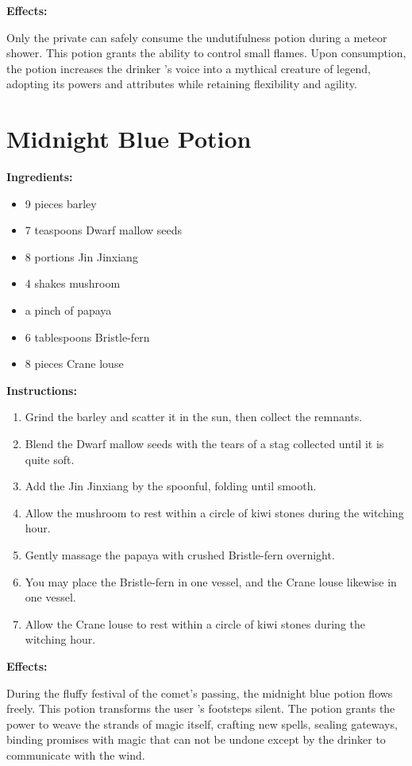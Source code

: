 \documentclass{article}
\begin{document}
\textbf{Effects:}

Only the private can safely consume the undutifulness potion during a meteor shower. This potion grants the ability to control small flames. Upon consumption, the potion increases the drinker 's voice into a mythical creature of legend, adopting its powers and attributes while retaining flexibility and agility.

\newpage
\section*{Midnight Blue Potion}

\textbf{Ingredients:}

\begin{itemize}
  \item 9 pieces barley
  \item 7 teaspoons Dwarf mallow seeds
  \item 8 portions Jin Jinxiang
  \item 4 shakes mushroom
  \item a pinch of papaya
  \item 6 tablespoons Bristle-fern
  \item 8 pieces Crane louse
\end{itemize}

\textbf{Instructions:}

\begin{enumerate}
  \item Grind the barley and scatter it in the sun, then collect the remnants.
  \item Blend the Dwarf mallow seeds with the tears of a stag collected until it is quite soft.
  \item Add the Jin Jinxiang by the spoonful, folding until smooth.
  \item Allow the mushroom to rest within a circle of kiwi stones during the witching hour.
  \item Gently massage the papaya with crushed Bristle-fern overnight.
  \item You may place the Bristle-fern in one vessel, and the Crane louse likewise in one vessel.
  \item Allow the Crane louse to rest within a circle of kiwi stones during the witching hour.
\end{enumerate}

\textbf{Effects:}

During the fluffy festival of the comet’s passing, the midnight blue potion flows freely. This potion transforms the user 's footsteps silent. The potion grants the power to weave the strands of magic itself, crafting new spells, sealing gateways, binding promises with magic that can not be undone except by the drinker to communicate with the wind.
\end{document}
